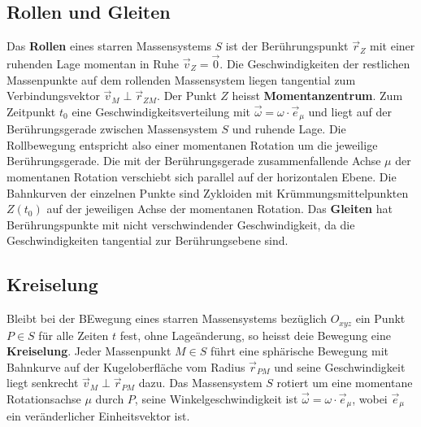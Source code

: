 \subsection{Rollen und Gleiten}
Das \textbf{Rollen} eines starren Massensystems $S$ ist der Berührungspunkt $\overrightarrow{r}_Z$ mit einer ruhenden Lage momentan in Ruhe $\overrightarrow{v}_Z=\overrightarrow{0}$. Die Geschwindigkeiten der restlichen Massenpunkte auf dem rollenden Massensystem liegen tangential zum Verbindungsvektor $\overrightarrow{v}_M\perp \overrightarrow{r}_{ZM}$. Der Punkt $Z$ heisst \textbf{Momentanzentrum}. 
\newline\newline
Zum Zeitpunkt $t_0$ eine Geschwindigkeitsverteilung mit $\overrightarrow{\omega}=\omega\cdot \overrightarrow{e}_{\mu}$ und liegt auf der Berührungsgerade zwischen Massensystem $S$ und ruhende Lage. Die Rollbewegung entspricht also einer momentanen Rotation um die jeweilige Berührungsgerade. Die mit der Berührungsgerade zusammenfallende Achse $\mu$ der momentanen Rotation verschiebt sich parallel auf der horizontalen Ebene. Die Bahnkurven der einzelnen Punkte sind Zykloiden mit Krümmungsmittelpunkten $Z\left(t_0\right)$ auf der jeweiligen Achse der momentanen Rotation.
\newline\newline
Das \textbf{Gleiten} hat Berührungspunkte mit nicht verschwindender Geschwindigkeit, da die Geschwindigkeiten tangential zur Berührungsebene sind. 
\subsection{Kreiselung}
Bleibt bei der BEwegung eines starren Massensystems bezüglich $O_{xyz}$ ein Punkt $P\in S$ für alle Zeiten $t$ fest, ohne Lageänderung, so heisst deie Bewegung eine \textbf{Kreiselung}. \newline\newline
Jeder Massenpunkt $M\in S$ führt eine sphärische Bewegung mit Bahnkurve auf der Kugeloberfläche vom Radius $\overrightarrow{r}_{PM}$ und seine Geschwindigkeit liegt senkrecht $\overrightarrow{v}_M\perp \overrightarrow{r}_{PM}$ dazu. Das Massensystem $S$ rotiert um eine momentane Rotationsachse $\mu$ durch $P$, seine Winkelgeschwindigkeit ist $\overrightarrow{\omega}=\omega\cdot \overrightarrow{e}_{\mu}$, wobei $\overrightarrow{e}_{\mu}$ ein veränderlicher Einheitsvektor ist.
